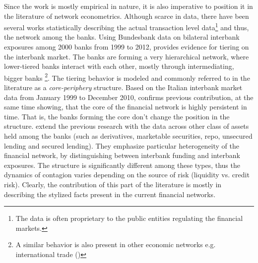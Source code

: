 \documentclass[12pt]{article}
\begin{document}
Since the work is mostly empirical in nature, it is also imperative to position it in the literature of network econometrics. Although scarce in data, there have been several works statistically describing the actual transaction level data\footnote{The data is often proprietary to the public entities regulating the financial markets.} and thus, the network among the banks.  Using Bundesbank data on bilateral interbank exposures among 2000 banks from 1999 to 2012, \cite{craig14} provides evidence for tiering on the interbank market. The banks are forming a very hierarchical network, where lower-tiered banks interact with each other, mostly through intermediating, bigger banks \footnote{A similar behavior is also present in other economic networks e.g. international trade (\cite{antras11})}. The tiering behavior is modeled and commonly referred to in the literature as a \textit{core-periphery} structure. Based on the Italian interbank market data from January 1999 to December 2010, \cite{fricke2015} confirms previous contribution, at the same time showing, that the core of the financial network is highly persistent in time. That is, the banks forming the core don't change the position in the structure. \cite{langfield14} extend the previous research with the data across other class of assets held among the banks (such as derivatives, marketable securities, repo, unsecured lending and secured lending). They emphasize particular heterogeneity of the financial network, by distinguishing between interbank funding and interbank exposures. The structure is significantly different among these types, thus the dynamics of contagion varies depending on the source of risk (liquidity vs. credit risk). Clearly, the contribution of this part of the literature is mostly in describing the stylized facts present in the current financial networks.
\end{document}
